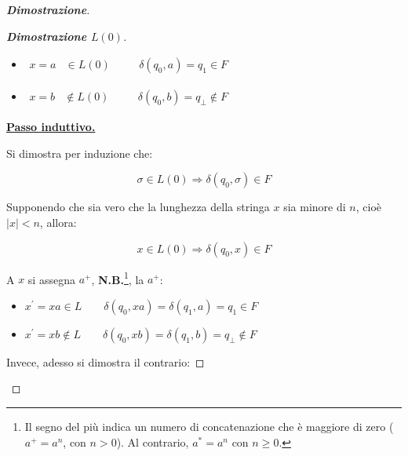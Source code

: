\documentclass[a4paper]{article}
\begin{document}
\begin{proof}[\textcolor{Blue3}{\textbf{Dimostrazione}}]
\begin{proof}[\textbf{Dimostrazione $L\left(0\right)$}]
\begin{itemize}[label=-]
				\item $\begin{array}{lllll}
					x = a & \in L\left(0\right) & \hspace{1em} & \delta\left(q_{0}, a\right) = q_{1} \in F
				\end{array}$
				
				\item $\begin{array}{lllll}
					x = b & \notin L\left(0\right) & \hspace{1em} & \delta\left(q_{0}, b\right) = q_{\bot} \notin F
				\end{array}$
			\end{itemize}
		
			\noindent
			\textbf{\underline{Passo induttivo.}}\newline
		
			\noindent
			Si dimostra per induzione che:
			
			\begin{equation*}
				\sigma \in L\left(0\right) \Longrightarrow \delta\left(q_{0}, \sigma\right) \in F
			\end{equation*}
		
			\noindent
			Supponendo che sia vero che la lunghezza della stringa $x$ sia minore di $n$, cioè $|x| < n$, allora:
			
			\begin{equation*}
				x \in L\left(0\right) \Longrightarrow \delta\left(q_{0}, x\right) \in F
			\end{equation*}
		
			\noindent
			A $x$ si assegna $a^{+}$, \textbf{N.B.}\footnote{Il segno del più indica un numero di concatenazione che è maggiore di zero ($a^{+} = a^{n}$, con $n > 0$). Al contrario, $a^{*} = a^{n}$ con $n \ge 0$.}, la $a^{+}$:
			
			\begin{itemize}[label=-]
				\item $x^{'} = xa \in L \hspace{2em} \delta\left(q_{0}, xa\right) = \delta\left(q_{1}, a\right) = q_{1} \in F$
				
				\item $x^{'} = xb \notin L \hspace{2em} \delta\left(q_{0}, xb\right) = \delta\left(q_{1}, b\right) = q_{\bot} \notin F$
			\end{itemize}
		
			\noindent
			Invece, adesso si dimostra il contrario:
			

\end{proof}
\end{proof}
\end{document}
